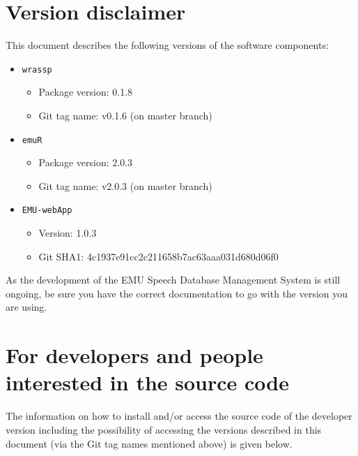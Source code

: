 \documentclass[]{book}
\providecommand{\tightlist}{%
  \setlength{\itemsep}{0pt}\setlength{\parskip}{0pt}}
\begin{document}
\hypertarget{version-disclaimer}{%
\section{Version disclaimer}\label{version-disclaimer}}

This document describes the following versions of the software components:

\begin{itemize}
\tightlist
\item
  \texttt{wrassp}

  \begin{itemize}
  \tightlist
  \item
    Package version: 0.1.8
  \item
    Git tag name: v0.1.6 (on master branch)
  \end{itemize}
\item
  \texttt{emuR}

  \begin{itemize}
  \tightlist
  \item
    Package version: 2.0.3
  \item
    Git tag name: v2.0.3 (on master branch)
  \end{itemize}
\item
  \texttt{EMU-webApp}

  \begin{itemize}
  \tightlist
  \item
    Version: 1.0.3
  \item
    Git SHA1: 4c1937e91cc2c211658b7ac63aaa031d680d06f0
  \end{itemize}
\end{itemize}

As the development of the EMU Speech Database Management System is still ongoing, be sure you have the correct documentation to go with the version you are using.

\hypertarget{for-developers-and-people-interested-in-the-source-code}{%
\section{For developers and people interested in the source code}\label{for-developers-and-people-interested-in-the-source-code}}

The information on how to install and/or access the source code of the developer version including the possibility of accessing the versions described in this document (via the Git tag names mentioned above) is given below.
\end{document}
